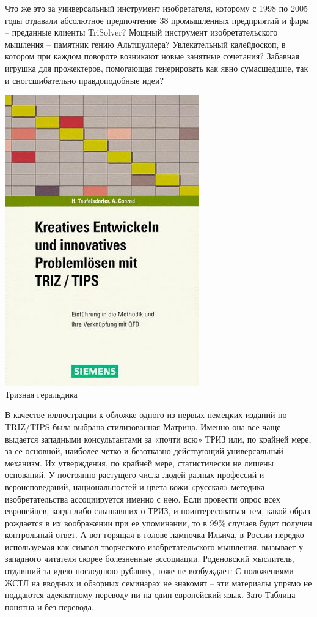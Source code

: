 \documentclass[11pt,a4paper]{article}
\begin{document}
Что же это за универсальный инструмент изобретателя, которому с 1998 по 2005
годы отдавали абсолютное предпочтение 38 промышленных предприятий и фирм --
преданные клиенты TriSolver? Мощный инструмент изобретательского мышления --
памятник гению Альтшуллера? Увлекательный калейдоскоп, в котором при каждом
повороте возникают новые занятные сочетания? Забавная игрушка для прожектеров,
помогающая генерировать как явно сумасшедшие, так и сногсшибательно
правдоподобные идеи?

\begin{center}
  \includegraphics[width=.5\textwidth]{./5.jpg} \\
  Тризная геральдика
\end{center}
В качестве иллюстрации к обложке одного из первых немецких изданий по
TRIZ/TIPS \cite{Teufelsdorfer1998} была выбрана стилизованная Матрица. Именно
она все чаще выдается западными консультантами за «почти всю» ТРИЗ или, по
крайней мере, за ее основной, наиболее четко и безотказно действующий
универсальный механизм. Их утверждения, по крайней мере, статистически не
лишены оснований. У постоянно растущего числа людей разных профессий и
вероисповеданий, национальностей и цвета кожи «русская» методика
изобретательства ассоциируется именно с нею. Если провести опрос всех
европейцев, когда-либо слышавших о ТРИЗ, и поинтересоваться тем, какой образ
рождается в их воображении при ее упоминании, то в 99\% случаев будет получен
контрольный ответ. А вот горящая в голове лампочка Ильича, в России нередко
используемая как символ творческого изобретательского мышления, вызывает у
западного читателя скорее болезненные ассоциации. Роденовский мыслитель,
отдавший за идею последнюю рубашку, тоже не возбуждает: С положениями ЖСТЛ на
вводных и обзорных семинарах не знакомят -- эти материалы упрямо не поддаются
адекватному переводу ни на один европейский язык. Зато Таблица понятна и без
перевода.
\end{document}
